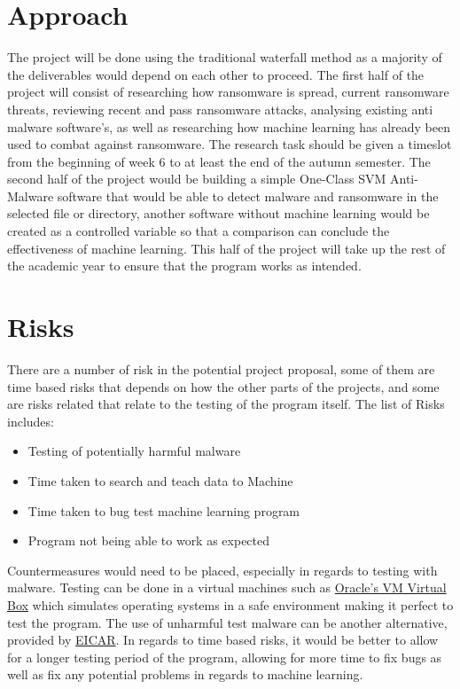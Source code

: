 \documentclass[progress]{cmpreport}
\begin{document}
	\section{Approach}
		The project will be done using the traditional waterfall method as a majority of the deliverables would depend on each other to proceed. The first half of the project will consist of researching how ransomware is spread, current ransomware threats, reviewing recent and pass ransomware attacks, analysing existing anti malware software's, as well as researching how machine learning has already been used to combat against ransomware. The research task should be given a timeslot from the beginning of week 6 to at least the end of the autumn semester. The second half of the project would be building a simple One-Class SVM Anti-Malware software that would be able to detect malware and ransomware in the selected file or directory, another software without machine learning would be created as a controlled variable so that a comparison can conclude the effectiveness of machine learning. This half of the project will take up the rest of the academic year to ensure that the program works as intended.  
	
	\section{Risks}	
		There are a number of risk in the potential project proposal, some of them are time based risks that depends on how the other parts of the projects, and some are risks related that relate to the testing of the program itself. The list of Risks includes:
		\begin{itemize}
			\item Testing of potentially harmful malware
			\item Time taken to search and teach data to Machine
			\item Time taken to bug test machine learning program
			\item Program not being able to work as expected 
		\end{itemize}
		Countermeasures would need to be placed, especially in regards to testing with malware. Testing can be done in a virtual machines such as \href{https://www.virtualbox.org/}{Oracle's VM Virtual Box} which simulates operating systems in a safe environment making it perfect to test the program. The use of unharmful test malware can be another alternative, provided by \href{https://www.eicar.org/?page_id=3950}{EICAR}. In regards to time based risks, it would be better to allow for a longer testing period of the program, allowing for more time to fix bugs as well as fix any potential problems in regards to machine learning.
	\pagebreak
	
\end{document}
